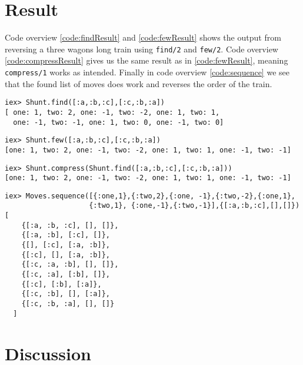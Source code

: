 \documentclass[a4paper,11pt]{article}
\newenvironment{code}{\captionsetup{type=listing}}{}
\begin{document}
\section*{Result}
Code overview \ref{code:findResult} and \ref{code:fewResult} shows the output from reversing a three wagons long train 
using {\tt find/2} and {\tt few/2}.
Code overview \ref{code:compressResult} gives us the same result as in \ref{code:fewResult}, meaning {\tt compress/1} 
works as intended.
Finally in code overview \ref{code:sequence} we see that the found list of moves does work and reverses the order of the 
train.  

\begin{code}
\label{code:findResult}
\begin{verbatim}
iex> Shunt.find([:a,:b,:c],[:c,:b,:a])
[ one: 1, two: 2, one: -1, two: -2, one: 1, two: 1,
  one: -1, two: -1, one: 1, two: 0, one: -1, two: 0]
\end{verbatim}
\end{code}

\begin{code}
\label{code:fewResult}
\begin{verbatim}
iex> Shunt.few([:a,:b,:c],[:c,:b,:a])
[one: 1, two: 2, one: -1, two: -2, one: 1, two: 1, one: -1, two: -1]
\end{verbatim}
\end{code}

\begin{code}
\label{code:compressResult}
\begin{verbatim}
iex> Shunt.compress(Shunt.find([:a,:b,:c],[:c,:b,:a]))
[one: 1, two: 2, one: -1, two: -2, one: 1, two: 1, one: -1, two: -1]
\end{verbatim}
\end{code}

\begin{code}
\label{code:sequence}
\begin{verbatim}
iex> Moves.sequence([{:one,1},{:two,2},{:one, -1},{:two,-2},{:one,1},
                    {:two,1}, {:one,-1},{:two,-1}],{[:a,:b,:c],[],[]})
[
    {[:a, :b, :c], [], []},
    {[:a, :b], [:c], []},
    {[], [:c], [:a, :b]},
    {[:c], [], [:a, :b]},
    {[:c, :a, :b], [], []},
    {[:c, :a], [:b], []},
    {[:c], [:b], [:a]},
    {[:c, :b], [], [:a]},
    {[:c, :b, :a], [], []}
  ]
\end{verbatim}
\end{code}

\section*{Discussion}
\end{document}
